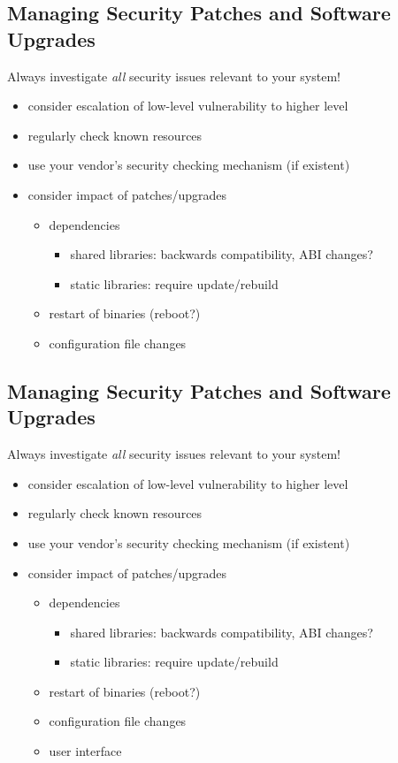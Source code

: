 \documentclass[xga]{xdvislides}
\begin{document}
\subsection{Managing Security Patches and Software Upgrades}
Always investigate {\em all} security issues relevant to your system!
\begin{itemize}
	\item consider escalation of low-level vulnerability to higher level
	\item regularly check known resources
	\item use your vendor's security checking mechanism (if existent)
	\item consider impact of patches/upgrades
		\begin{itemize}
			\item dependencies
				\begin{itemize}
					\item shared libraries:  backwards compatibility, ABI
						changes?
					\item static libraries:  require update/rebuild
				\end{itemize}
			\item restart of binaries (reboot?)
			\item configuration file changes
		\end{itemize}
\end{itemize}

\subsection{Managing Security Patches and Software Upgrades}
Always investigate {\em all} security issues relevant to your system!
\begin{itemize}
	\item consider escalation of low-level vulnerability to higher level
	\item regularly check known resources
	\item use your vendor's security checking mechanism (if existent)
	\item consider impact of patches/upgrades
		\begin{itemize}
			\item dependencies
				\begin{itemize}
					\item shared libraries:  backwards compatibility, ABI
						changes?
					\item static libraries:  require update/rebuild
				\end{itemize}
			\item restart of binaries (reboot?)
			\item configuration file changes
			\item user interface
		\end{itemize}
\end{itemize}
\end{document}
